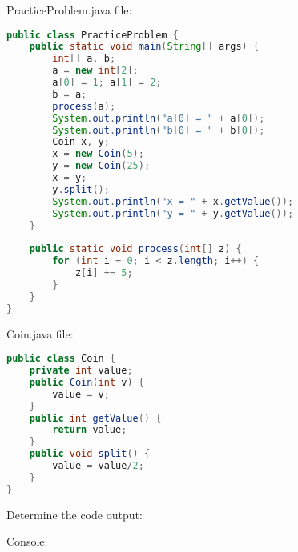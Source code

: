 \documentclass[9pt]{article}
\begin{document}
\begin{multicols}{2}
PracticeProblem.java file:
\begin{lstlisting}[language=Java]
public class PracticeProblem {
	public static void main(String[] args) {
		int[] a, b;
		a = new int[2];
		a[0] = 1; a[1] = 2;
		b = a;
		process(a);
		System.out.println("a[0] = " + a[0]);
		System.out.println("b[0] = " + b[0]);
		Coin x, y;
		x = new Coin(5);
		y = new Coin(25);
		x = y;
		y.split();
		System.out.println("x = " + x.getValue());
		System.out.println("y = " + y.getValue());
	}
	
	public static void process(int[] z) {
		for (int i = 0; i < z.length; i++) {
			z[i] += 5;
		}
	}
}
\end{lstlisting}
\vspace{5mm}
Coin.java file:
\begin{lstlisting}[language=Java]
public class Coin {
	private int value;
	public Coin(int v) {
		value = v;
	}
	public int getValue() {
		return value;
	}
	public void split() {
		value = value/2;
	}
}
\end{lstlisting}
\vfill
\columnbreak
Determine the code output:
\hfill\vspace{5mm}

Console:

\end{multicols}
\end{document}
